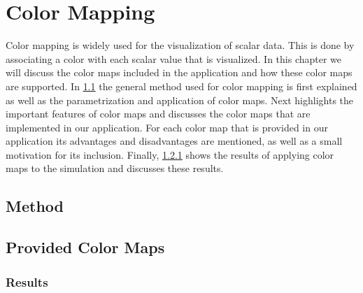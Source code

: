 
\chapter{Color Mapping} %
\label{cha:color_mapping}
Color mapping is widely used for the visualization of scalar data. This is done by associating a color with each scalar value that is visualized. In this chapter we will discuss the color maps included in the application and how these color maps are supported. In \cref{s:colormapping:method} the general method used for color mapping is first explained as well as the parametrization and application of color maps. Next  highlights the important features of color maps and discusses the color maps that are implemented in our application. For each color map that is provided in our application its advantages and disadvantages are mentioned, as well as a small motivation for its inclusion. Finally, \cref{s:colormapping:results} shows the results of applying color maps to the simulation and discusses these results.


\section{Method}
\label{s:colormapping:method}


\section{Provided Color Maps}
\label{s:colormaps:differentmaps}


\subsection{Results}
\label{s:colormapping:results}


